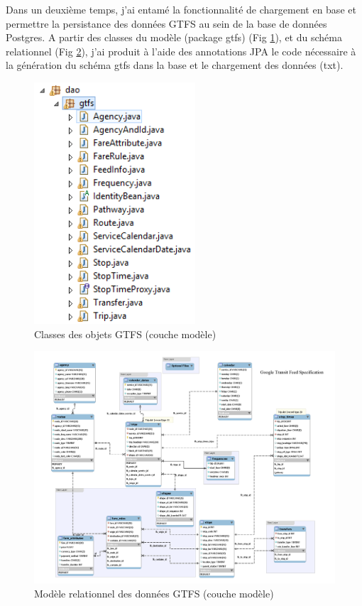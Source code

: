 \begin{itemize}
Dans un deuxième temps, j'ai entamé la fonctionnalité de chargement en base et permettre la persistance des données GTFS au sein de la base de données Postgres. A partir des classes du modèle (package gtfs) (Fig \ref{packageGTFS}), et du schéma relationnel  (Fig \ref{RelationalGTFS}), j'ai produit à l'aide des annotations JPA le code nécessaire à la génération du schéma gtfs dans la base et le chargement des données (txt).\\
\begin{figure}[!h]
\centering
\includegraphics[width=6cm]{images/model_GTFS.PNG}
\caption{\label{packageGTFS}Classes des objets GTFS (couche modèle)}
\end{figure}

\begin{figure}[!h]
\centering
\includegraphics[width=14cm]{images/GTFS_Schema.png}
\caption{\label{RelationalGTFS}Modèle relationnel des données GTFS (couche modèle)}
\end{figure}



\end{itemize}
